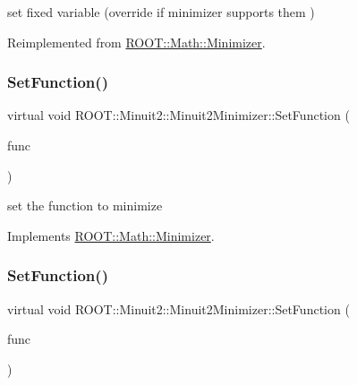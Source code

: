 set fixed variable (override if minimizer supports them ) 



Reimplemented from \mbox{\hyperlink{classROOT_1_1Math_1_1Minimizer_a063e9d83c8a61afc8798ebb1d74b6f2b}{R\+O\+O\+T\+::\+Math\+::\+Minimizer}}.

\mbox{\label{classROOT_1_1Minuit2_1_1Minuit2Minimizer_ae18efc66a943fe11b1114ff8c1b28ad0}} 
\subsubsection{\texorpdfstring{SetFunction()}{SetFunction()}\hspace{0.1cm}{\footnotesize\ttfamily [1/6]}}
{\footnotesize\ttfamily virtual void R\+O\+O\+T\+::\+Minuit2\+::\+Minuit2\+Minimizer\+::\+Set\+Function (\begin{DoxyParamCaption}\item[{const \mbox{\hyperlink{namespaceROOT_1_1Math_aec22897f3d759f7c284893c81d980799}{R\+O\+O\+T\+::\+Math\+::\+I\+Multi\+Gen\+Function}} \&}]{func }\end{DoxyParamCaption})\hspace{0.3cm}{\ttfamily [virtual]}}



set the function to minimize 



Implements \mbox{\hyperlink{classROOT_1_1Math_1_1Minimizer_a4391c613ab0c3f9777e56b487ffa5eac}{R\+O\+O\+T\+::\+Math\+::\+Minimizer}}.

\mbox{\label{classROOT_1_1Minuit2_1_1Minuit2Minimizer_ae18efc66a943fe11b1114ff8c1b28ad0}} 
\subsubsection{\texorpdfstring{SetFunction()}{SetFunction()}\hspace{0.1cm}{\footnotesize\ttfamily [2/6]}}
{\footnotesize\ttfamily virtual void R\+O\+O\+T\+::\+Minuit2\+::\+Minuit2\+Minimizer\+::\+Set\+Function (\begin{DoxyParamCaption}\item[{const \mbox{\hyperlink{namespaceROOT_1_1Math_aec22897f3d759f7c284893c81d980799}{R\+O\+O\+T\+::\+Math\+::\+I\+Multi\+Gen\+Function}} \&}]{func }\end{DoxyParamCaption})\hspace{0.3cm}{\ttfamily [virtual]}}



